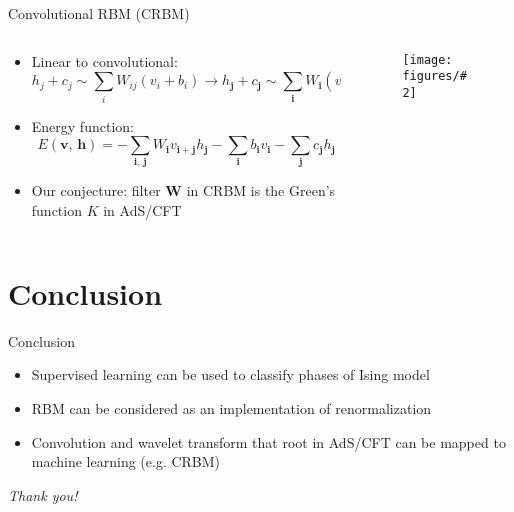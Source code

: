 \documentclass[aspectratio=169]{beamer}
\def\bm#1{{\symbf{#1}}}
\newcommand\imageinput[2][]{\texttt{[image: figures/\#2]}}
\def\AdSCFT{AdS/CFT}
\begin{document}
\begin{frame}{Convolutional RBM (CRBM)}
\begin{columns}[t]
  \begin{column}{0.68\textwidth}
    \begin{itemize}
      \item Linear to convolutional:
        \[
          h_j+c_j \sim \sum_i W_{ij} (v_i+b_i) \to
          h_{\bm{j}} + c_{\bm{j}} \sim
            \sum_{\bm{i}} W_{\bm{i}} (v_{\bm{i}+\bm{j}} + b_{\bm{i}+\bm{j}})
        \]
      \item Energy function:
        \[
          E(\bm{v},\,\bm{h})
          = - \sum_{\bm{i},\,\bm{j}} W_{\bm{i}} v_{\bm{i}+\bm{j}} h_{\bm{j}}
            - \sum_{\bm{i}} b_{\bm{i}} v_{\bm{i}} - \sum_{\bm{j}} c_{\bm{j}} h_{\bm{j}}
        \]
      \item Our conjecture: filter $\bm{W}$ in CRBM is the Green's function $K$ in \AdSCFT{}
    \end{itemize}
  \end{column}
  \begin{column}{0.3\textwidth}
    \begin{figure}
      \centering
      \imageinput[width=\textwidth]{crbm.pdf}
    \end{figure}
  \end{column}
\end{columns}
\end{frame}

\section{Conclusion}

\begin{frame}{Conclusion}
\begin{itemize}
  \item Supervised learning can be used to classify phases of Ising model
  \item RBM can be considered as an implementation of renormalization
  \item Convolution and wavelet transform that root in \AdSCFT{} can be mapped to
    machine learning (e.g. CRBM)
\end{itemize}
\end{frame}

\begin{frame}[standout]
\LARGE\itshape
Thank you!
\end{frame}

\appendix
\end{document}
